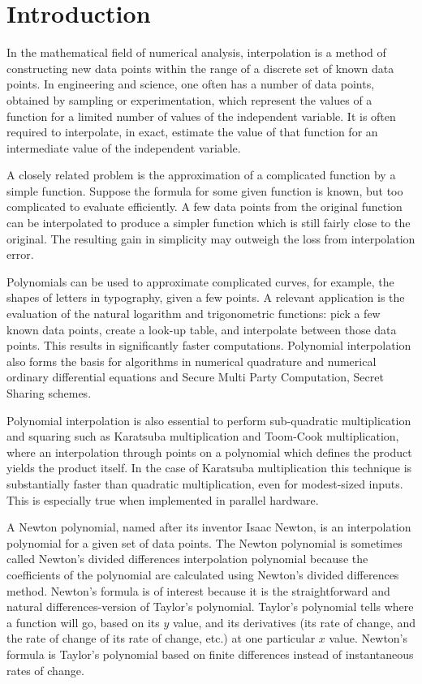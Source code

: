 \documentclass[preprint,12pt]{elsarticle}
\begin{document}

\section{Introduction}
\label{S:1}

In the mathematical field of numerical analysis, interpolation is a method of constructing new data points within the range of a discrete set of known data points. In engineering and science, one often has a number of data points, obtained by sampling or experimentation, which represent the values of a function for a limited number of values of the independent variable. It is often required to interpolate, in exact, estimate the value of that function for an intermediate value of the independent variable.

A closely related problem is the approximation of a complicated function by a simple function. Suppose the formula for some given function is known, but too complicated to evaluate efficiently. A few data points from the original function can be interpolated to produce a simpler function which is still fairly close to the original. The resulting gain in simplicity may outweigh the loss from interpolation error.

Polynomials can be used to approximate complicated curves, for example, the shapes of letters in typography, given a few points. A relevant application is the evaluation of the natural logarithm and trigonometric functions: pick a few known data points, create a look-up table, and interpolate between those data points. This results in significantly faster computations. Polynomial interpolation also forms the basis for algorithms in numerical quadrature and numerical ordinary differential equations and Secure Multi Party Computation, Secret Sharing schemes.

Polynomial interpolation is also essential to perform sub-quadratic multiplication and squaring such as Karatsuba multiplication and Toom-Cook multiplication, where an interpolation through points on a polynomial which defines the product yields the product itself. In the case of Karatsuba multiplication this technique is substantially faster than quadratic multiplication, even for modest-sized inputs. This is especially true when implemented in parallel hardware.

A Newton polynomial, named after its inventor Isaac Newton, is an interpolation polynomial for a given set of data points. The Newton polynomial is sometimes called Newton's divided differences interpolation polynomial because the coefficients of the polynomial are calculated using Newton's divided differences method. Newton's formula is of interest because it is the straightforward and natural differences-version of Taylor's polynomial. Taylor's polynomial tells where a function will go, based on its $y$ value, and its derivatives (its rate of change, and the rate of change of its rate of change, etc.) at one particular $x$ value. Newton's formula is Taylor's polynomial based on finite differences instead of instantaneous rates of change.
\end{document}
